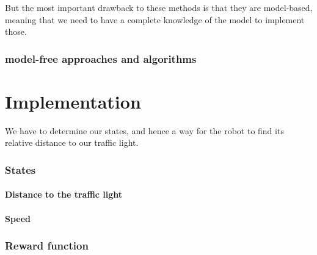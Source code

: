 \documentclass[14pt,a4paper]{article}
\theoremstyle{definition}
\begin{document}
But the most important drawback to these methods is that they are model-based, meaning that we need to have a complete knowledge of the model to implement those.

\section{model-free approaches and algorithms}

\newpage
\part*{Implementation}
We have to determine our states, and hence a way for the robot to find its relative distance to our traffic light.
\section{States}
\subsection{Distance to the traffic light}
\subsection{Speed}

\section{Reward function}



















\newpage
{}




\end{document}
